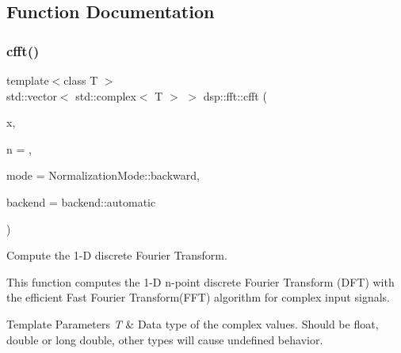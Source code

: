 \subsection{Function Documentation}
\mbox{\label{namespacedsp_1_1fft_ae1e8b2af8a1d75b65f349492f865631d}} 
\subsubsection{\texorpdfstring{cfft()}{cfft()}}
{\footnotesize\ttfamily template$<$class T $>$ \\
std\+::vector$<$ std\+::complex$<$ T $>$ $>$ dsp\+::fft\+::cfft (\begin{DoxyParamCaption}\item[{const std\+::vector$<$ std\+::complex$<$ T $>$$>$ \&}]{x,  }\item[{unsigned}]{n = {},  }\item[{\mbox{\hyperlink{namespacedsp_1_1fft_aadeffdb34ec53320437b1c6dd1354915}{Normalization\+Mode}}}]{mode = {\ttfamily NormalizationMode\+:\+:backward},  }\item[{\mbox{\hyperlink{namespacedsp_1_1fft_a4fef2564f82f5eb8ea2d5c9909fb2ba4}{backend}}}]{backend = {\ttfamily backend\+:\+:automatic} }\end{DoxyParamCaption})}



Compute the 1-\/D discrete Fourier Transform. 

This function computes the 1-\/D n-\/point discrete Fourier Transform (D\+FT) with the efficient Fast Fourier Transform(\+F\+F\+T) algorithm for complex input signals. 
\begin{DoxyTemplParams}{Template Parameters}
{\em T} & Data type of the complex values. Should be float, double or long double, other types will cause undefined behavior. \\
\hline
\end{DoxyTemplParams}

